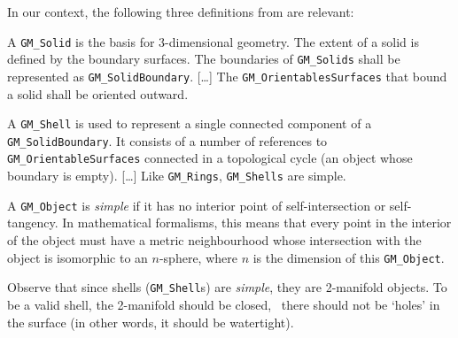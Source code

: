 %

In our context, the following three definitions from \citet{ISO19107} are relevant:
\begin{definition}
A \texttt{GM\_Solid} is the basis for 3-dimensional geometry. 
The extent of a solid is defined by the boundary surfaces.
The boundaries of \texttt{GM\_Solids} shall be represented as \texttt{GM\_SolidBoundary}.
[\ldots] 
The \texttt{GM\_OrientablesSurfaces} that bound a solid shall be oriented outward.
\end{definition}
\begin{definition}
A \texttt{GM\_Shell} is used to represent a single connected component of a \texttt{GM\_SolidBoundary}. 
It consists of a number of references to \texttt{GM\_OrientableSurfaces} connected in a topological cycle (an object whose boundary is empty). 
[\ldots] 
Like \texttt{GM\_Rings}, \texttt{GM\_Shells} are simple.
\end{definition}
\begin{definition}
A \texttt{GM\_Object} is \emph{simple} if it has no interior point of self-intersection or self-tangency. 
In mathematical formalisms, this means that every point in the interior of the object must have a metric neighbourhood whose intersection with the object is isomorphic to an $n$-sphere, where $n$ is the dimension of this \texttt{GM\_Object}.
\end{definition}

%

Observe that since shells (\texttt{GM\_Shell}s) are \emph{simple}, they are 2-manifold objects.
To be a valid shell, the 2-manifold should be closed, \ie\ there should not be `holes' in the surface (in other words, it should be watertight).

%

